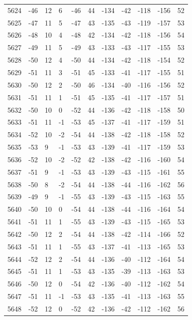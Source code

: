 \begin{table}[H]
\begin{tabular}{lllllllllll}
5624 & -46 & 12 & 6 & -46 & 44 & -134 & -42 & -118 & -156 & 52 \\
5625 & -47 & 11 & 5 & -47 & 43 & -135 & -43 & -119 & -157 & 53 \\
5626 & -48 & 10 & 4 & -48 & 42 & -134 & -42 & -118 & -156 & 54 \\
5627 & -49 & 11 & 5 & -49 & 43 & -133 & -43 & -117 & -155 & 53 \\
5628 & -50 & 12 & 4 & -50 & 44 & -134 & -42 & -118 & -154 & 52 \\
5629 & -51 & 11 & 3 & -51 & 45 & -133 & -41 & -117 & -155 & 51 \\
5630 & -50 & 12 & 2 & -50 & 46 & -134 & -40 & -116 & -156 & 52 \\
5631 & -51 & 11 & 1 & -51 & 45 & -135 & -41 & -117 & -157 & 51 \\
5632 & -50 & 10 & 0 & -52 & 44 & -136 & -42 & -118 & -158 & 50 \\
5633 & -51 & 11 & -1 & -53 & 45 & -137 & -41 & -117 & -159 & 51 \\
5634 & -52 & 10 & -2 & -54 & 44 & -138 & -42 & -118 & -158 & 52 \\
5635 & -53 & 9 & -1 & -53 & 43 & -139 & -41 & -117 & -159 & 53 \\
5636 & -52 & 10 & -2 & -52 & 42 & -138 & -42 & -116 & -160 & 54 \\
5637 & -51 & 9 & -1 & -53 & 43 & -139 & -43 & -115 & -161 & 55 \\
5638 & -50 & 8 & -2 & -54 & 44 & -138 & -44 & -116 & -162 & 56 \\
5639 & -49 & 9 & -1 & -55 & 43 & -139 & -43 & -115 & -163 & 55 \\
5640 & -50 & 10 & 0 & -54 & 44 & -138 & -44 & -116 & -164 & 54 \\
5641 & -51 & 11 & 1 & -55 & 43 & -139 & -43 & -115 & -165 & 53 \\
5642 & -50 & 12 & 2 & -54 & 44 & -138 & -42 & -114 & -166 & 52 \\
5643 & -51 & 11 & 1 & -55 & 43 & -137 & -41 & -113 & -165 & 53 \\
5644 & -52 & 12 & 2 & -54 & 44 & -136 & -40 & -112 & -164 & 54 \\
5645 & -51 & 11 & 1 & -53 & 43 & -135 & -39 & -113 & -163 & 53 \\
5646 & -50 & 12 & 0 & -54 & 42 & -136 & -40 & -112 & -162 & 54 \\
5647 & -51 & 11 & -1 & -53 & 43 & -135 & -41 & -113 & -163 & 55 \\
5648 & -52 & 12 & 0 & -52 & 42 & -136 & -42 & -112 & -162 & 56 \\

\end{tabular}
\end{table}
